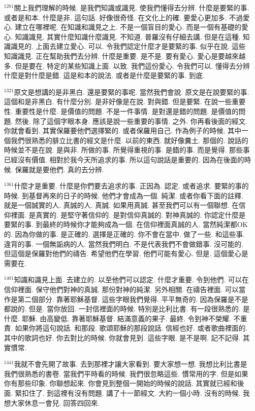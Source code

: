 \documentclass{book}
\begin{document}
$^{1281}$關上我們理解的時候.
是我們知識或識見.
使我們懂得去分辨.
什麼是要緊的事.
或者是和本.
什麼是非.
這句話.
好像很奇怪.
在文化上的確.
要愛心更加多.
不過愛心.
建立在哪裡呢.
在知識和識見之上.
不是一個盲目的愛心.
而是一個有基礎的愛心.
知識識見.
其實什麼知識什麼識見.
不知道.
普羅沒有仔細去講.
但是在這種.
知識識見的.
上面去建立愛心.
可以.
令我們認定什麼才是要緊的事.
似乎在說.
這些知識識見.
正在幫助我們去分辨.
什麼是重要.
是不是.
要有愛心.
愛心是要越來越多.
但是要在.
特定的某些知識上面.
以致.
我們這份愛心.
令我們可以.
懂得去分辨什麼是對什麼是錯.
這是和本的說法.
或者是什麼是要緊的事.
到底.

$^{1321}$原文是想講的是非黑白.
還是要緊的事呢.
當然我們會說.
原文是在說要緊的事.
這個和是非黑白.
有什麼分別.
是非好像是在說.
對與錯.
但是要緊.
在說一些重要性.
重要性是什麼.
是價值的問題.
不是一件事情.
是對還是錯的問題.
是價值的問題.
然後.
除了這個字眼本身.
應該是說一些重要的事情.
之外.
你再看後面的經文.
你就會看到.
其實保羅要他們選擇緊的.
或者保羅用自己.
作為例子的時候.
其中一個我們很熟悉的腓立比書的經文是什麼.
以前的東西.
就好像糞土.
那個的.
說話的時候並不是在說.
是與非.
所做的事.
所覺得重視的事.
是錯的事.
而是覺得.
那些事已經沒有價值.
相對於我今天所追求的事.
所以這句說話是重要的.
因為在後面的時候.
保羅就是要他們.
真的去分辨.

$^{1361}$什麼才是重要.
什麼是你們要去追求的事.
正因為.
認定.
或者追求.
要緊的事的時候.
到基督再來的日子的時候.
他們才會成為一個.
純潔.
或者你看下面的註釋.
就是一個誠實的人.
真誠的人.
真誠.
如果用真誠.
甚至我們可以有一個聯想.
在信仰裡面.
是真實的.
是堅守著信仰的.
是對信仰真誠的.
對神真誠的.
你認定什麼是要緊的事.
到最終的時候你才能夠成為一個.
在信仰裡面真誠的人.
當然純潔都OK的.
因為你做的事.
是正確的.
選擇是正確的.
你不會在當中.
做了一些.
和這些事.
違背的事.
一個無詬病的人.
當然我們明白.
不是代表我們不會做錯事.
沒可能的.
但這個是保羅對他們的禱告.
希望他們在學習.
他們可能有愛心.
但是.
這個愛心是需要在.

$^{1401}$知識和識見上面.
去建立的.
以至他們可以認定.
什麼才重要.
令到他們.
可以在信仰裡面.
保守他們對神的真誠.
那份對神的純潔.
另外相關.
在禱告裡面.
可以當作是第二個部分.
靠著耶穌基督.
這些字眼我們覺得.
平平無奇的.
因為保羅是不是都說的.
但是.
當你放回.
一封信裡面的時候.
特別是比利比書.
有一段很熟悉的.
是什麼.
耶穌.
由高變低.
靠著耶穌基督.
結滿意義的果子.
最終.
令到神不榮耀.
不重責.
如果你將這句說話.
和那段.
歌頌耶穌的那段說話.
信經也好.
或者歌曲裡面的.
其中的歌詞也好.
你去對比的時候.
你就會見到.
這些字眼.
是不是啊.
記不記得.
其實慣常.

$^{1441}$我就不會先開了故事.
去到那裡才讓大家看到.
要大家想一想.
我想比利比書是我們很熟悉的書卷.
當我們平時看的時候.
我們很忽略這些.
慣常用的字.
但是如果你有那些印象.
你聯想起來.
你會見到整個一開始的時候的說話.
其實就已經和後面.
緊扣住了.
到這裡有沒有問題.
講了十一節經文.
大約一個小時.
沒有的時候.
我想大家休息一會兒.
回答四回來.
\newpage
\end{document}
